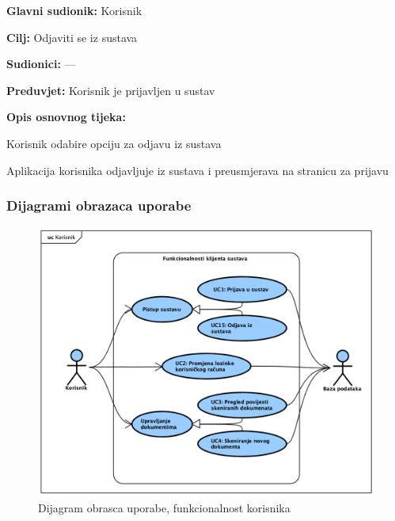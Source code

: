 					\noindent {}
					\begin{packed_item}
	
						\item \textbf{Glavni sudionik:} Korisnik
						\item  \textbf{Cilj:} Odjaviti se iz sustava
						\item  \textbf{Sudionici:} —
						\item  \textbf{Preduvjet:} Korisnik je prijavljen u sustav
						\item  \textbf{Opis osnovnog tijeka:}
						
						\item[] \begin{packed_enum}
	
							\item Korisnik odabire opciju za odjavu iz sustava
							\item Aplikacija korisnika odjavljuje iz sustava i preusmjerava na stranicu za prijavu

						\end{packed_enum}

					\end{packed_item}

				\eject{}
					
				\subsubsection{Dijagrami obrazaca uporabe}

					\begin{figure}[H]
						\includegraphics[width=\textwidth]{slike/UseCase_Korisnik.png} %
						\caption{Dijagram obrasca uporabe, funkcionalnost korisnika}
						\label{fig:usecase_korisnik} %
					\end{figure}

